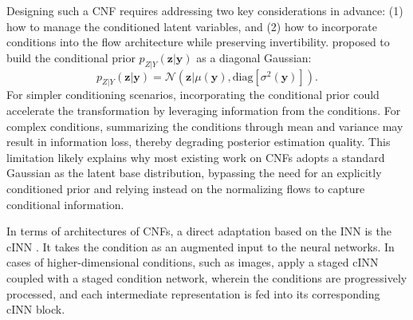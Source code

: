 Designing such a \ac{CNF} requires addressing two key considerations in advance: (1) how to manage the conditioned latent variables, and (2) how to incorporate conditions into the flow architecture while preserving invertibility. \citeauthor{winkler2023cnf} \citeyearpar{winkler2023cnf} proposed to build the conditional prior $p_{Z|Y}(\boldsymbol{z}|\boldsymbol{y})$ as a diagonal Gaussian:
\begin{equation}
    p_{Z|Y}(\boldsymbol{z}|\boldsymbol{y}) = \mathcal{N}({\boldsymbol{z}|\mu(\boldsymbol{y}), \text{diag}[\sigma^2(\boldsymbol{y})]}).
\end{equation}
For simpler conditioning scenarios, incorporating the conditional prior could accelerate the transformation by leveraging information from the conditions. For complex conditions, summarizing the conditions through mean and variance may result in information loss, thereby degrading posterior estimation quality. This limitation likely explains why most existing work on \acp{CNF} adopts a standard Gaussian as the latent base distribution, bypassing the need for an explicitly conditioned prior and relying instead on the normalizing flows to capture conditional information.

In terms of architectures of \acp{CNF}, a direct adaptation based on the \ac{INN} is the \ac{cINN} \citep{ardizzone2019cinn}. It takes the condition as an augmented input to the neural networks. In cases of higher-dimensional conditions, such as images, \citeauthor{govinda2021cinn} \citeyearpar{govinda2021cinn} apply a staged \ac{cINN} coupled with a staged condition network, wherein the conditions are progressively processed, and each intermediate representation is fed into its corresponding \ac{cINN} block.

